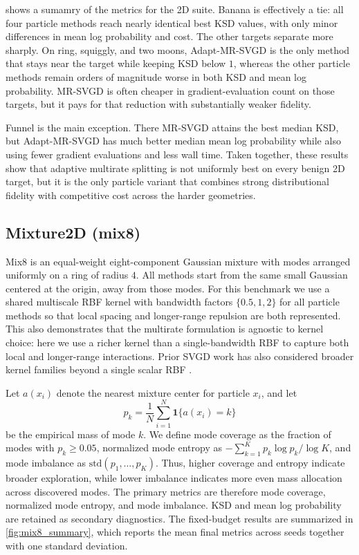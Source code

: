 shows a sumamry of the metrics for the 2D suite.
Banana is effectively a tie: all four particle methods reach nearly identical
best KSD values, with only minor differences in mean log probability and cost.
The other targets separate more sharply. On ring, squiggly, and two moons,
Adapt-MR-SVGD is the only method that stays near the target while keeping KSD
below $1$, whereas the other particle methods remain orders of magnitude worse
in both KSD and mean log probability. MR-SVGD is often cheaper in
gradient-evaluation count on those targets, but it pays for that reduction with
substantially weaker fidelity.

Funnel is the main exception. There MR-SVGD attains the best median KSD, but
Adapt-MR-SVGD has much better median mean log probability while also using
fewer gradient evaluations and less wall time. Taken together, these results
show that adaptive multirate splitting is not uniformly best on every benign 2D
target, but it is the only particle variant that combines strong
distributional fidelity with competitive cost across the harder geometries.

\subsection{Mixture2D (mix8)}

Mix8 is an equal-weight eight-component Gaussian mixture with modes arranged
uniformly on a ring of radius $4$. All methods start from the same small
Gaussian centered at the origin, away from those modes. For this benchmark we use a
shared multiscale RBF kernel with bandwidth factors $\{0.5,1,2\}$ for all
particle methods so that local spacing and longer-range repulsion are both
represented. This also demonstrates that the multirate formulation is agnostic
to kernel choice: here we use a richer kernel than a single-bandwidth RBF to
capture both local and longer-range interactions. Prior SVGD work has also
considered broader kernel families beyond a single scalar RBF
\cite{wang2019matrixsvgd,stordal2021pkernel}. 

Let $a(x_i)$ denote the nearest
mixture center for particle $x_i$, and let
\[
p_k=\frac{1}{N}\sum_{i=1}^{N}\mathbf{1}\{a(x_i)=k\}
\]
be the empirical mass of mode $k$. We define mode coverage as the fraction of
modes with $p_k\ge 0.05$, normalized mode entropy as
$-\sum_{k=1}^{K} p_k\log p_k / \log K$, and mode imbalance as
$\mathrm{std}(p_1,\ldots,p_K)$. Thus, higher coverage and entropy indicate
broader exploration, while lower imbalance indicates more even mass allocation
across discovered modes. The primary metrics are therefore mode coverage,
normalized mode entropy, and mode imbalance. KSD and mean log probability are
retained as secondary diagnostics. The fixed-budget results are summarized in
\cref{fig:mix8_summary}, which reports the mean final metrics across seeds
together with one standard deviation.

